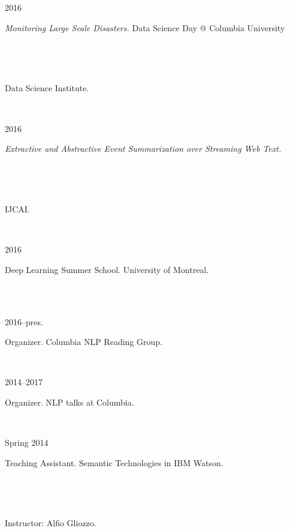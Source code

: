 \documentclass{scrartcl}
\newcommand{\MarginSection}[1]{\marginpar{#1}}
\begin{document}
\begin{cv}{}
\MarginSection{~\\Demos}


{\noindent\parbox{6em}{2016}  \textit{Monitoring Large Scale Disasters.} Data Science Day @ Columbia University} \\
 {\noindent\parbox{6em}{~~~~} \noindent  Data Science Institute.} \\

\MarginSection{~\\Doctoral\\Consortium}


{\noindent\parbox{6em}{2016}  \textit{Extractive and Abstractive Event Summarization over Streaming Web Text.}} \\
 {\noindent\parbox{6em}{~~~~} \noindent  IJCAI.}

~\\

\MarginSection{~\\Summer\\Schools}

{\noindent\parbox{6em}{2016}  Deep Learning Summer School. University of Montreal.} \\ ~\\


\MarginSection{~\\Community\\Service}

{\noindent\parbox{6em}{2016--pres.}  Organizer. Columbia NLP Reading Group.} \\
{\noindent\parbox{6em}{2014--2017}  Organizer. NLP talks at Columbia.} \\
 

\MarginSection{~\\Teaching\\Experience}

{\noindent\parbox{6em}{Spring 2014}  Teaching Assistant. Semantic Technologies in IBM Watson.}\\
{\noindent\parbox{6em}{~~~~~~~~~~~}  Instructor: Alfio Gliozzo.}

~\\ ~\\

\date{}

\end{cv}
\end{document}
